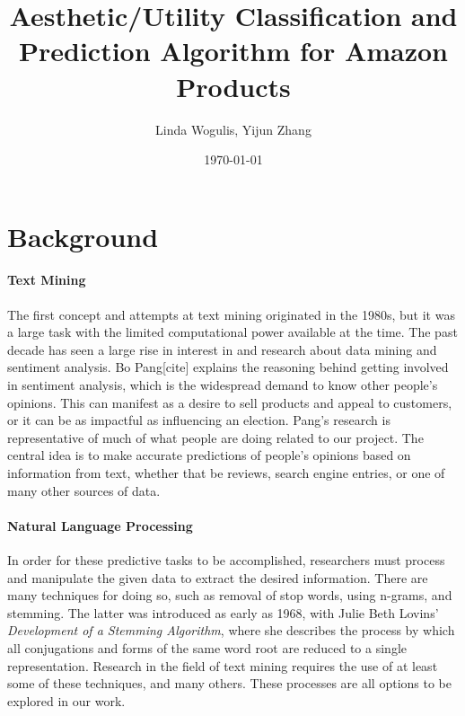 \documentclass[dvips,12pt]{article}
\begin{document}

\title{\textbf{Aesthetic/Utility Classification and Prediction Algorithm for Amazon Products}}
\author{Linda Wogulis, Yijun Zhang}
\date{\today}



\maketitle


\section{Background}


\paragraph{Text Mining}
The first concept and attempts at text mining originated in the 1980s, but it was a large task with the limited computational power available at the time. The past decade has seen a large rise in interest in and research about data mining and sentiment analysis. Bo Pang[cite] explains the reasoning behind getting involved in sentiment analysis, which is the widespread demand to know other people's opinions. This can manifest as a desire to sell products and appeal to customers, or it can be as impactful as influencing an election. Pang's research is representative of much of what people are doing related to our project. The central idea is to make accurate predictions of people's opinions based on information from text, whether that be reviews, search engine entries, or one of many other sources of data. 

\paragraph{Natural Language Processing}
	In order for these predictive tasks to be accomplished, researchers must process and manipulate the given data to extract the desired information. There are many techniques for doing so, such as removal of stop words, using n-grams, and stemming. The latter was introduced as early as 1968, with Julie Beth Lovins' \textit{Development of a Stemming Algorithm}, where she describes the process by which all conjugations and forms of the same word root are reduced to a single representation. Research in the field of text mining requires the use of at least some of these techniques, and many others. These processes are all options to be explored in our work.
\end{document}
